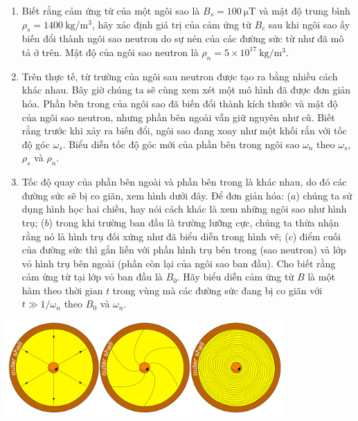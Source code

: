 \begin{vd}[Magnetars]
\begin{enumerate}[1)]
\begin{center}

    \end{center}
    \item Biết rằng cảm ứng từ của một ngôi sao là $B_{s}=100~\mathrm{\mu T}$ và mật độ trung bình $\rho_{s}=1400~\mathrm{kg/m^3}$, hãy xác định giá trị của cảm ứng từ $B_{c}$ sau khi ngôi sao ấy biến đổi thành ngôi sao neutron do sự nén của các đường sức từ như đã mô tả ở trên. Mật độ của ngôi sao neutron là $\rho_{n}=5\times10^{17}~\mathrm{kg/m^3}$.
    \item Trên thực tế, từ trường của ngôi sau neutron được tạo ra bằng nhiều cách khác nhau. Bây giờ chúng ta sẽ cùng xem xét một mô hình đã được đơn giản hóa. Phần bên trong của ngôi sao đã biến đổi thành kích thước và mật độ của ngôi sao neutron, nhưng phần bên ngoài vẫn giữ nguyên như cũ. Biết rằng trước khi xảy ra biến đổi, ngôi sao đang xoay như một khối rắn với tốc độ góc $\omega_{s}$. Biểu diễn tốc độ góc mới của phần bên trong ngôi sao $\omega_{n}$ theo $\omega_{s}$, $\rho_{s}$ và $\rho_{n}$.
    \item Tốc độ quay của phần bên ngoài và phần bên trong là khác nhau, do đó các đường sức sẽ bị co giãn, xem hình dưới đây. Để đơn giản hóa: ($a$) chúng ta sử dụng hình học hai chiều, hay nói cách khác là xem những ngôi sao như hình trụ; ($b$) trong khi trường ban đầu là trường lưỡng cực, chúng ta thừa nhận rằng nó là hình trụ đối xứng như đã biểu diễn trong hình vẽ; ($c$) điểm cuối của đường sức thì gắn liền với phần hình trụ bên trong (sao neutron) và lớp vỏ hình trụ bên ngoài (phần còn lại của ngôi sao ban đầu). Cho biết rằng cảm ứng từ tại lớp vỏ ban đầu là $B_0$. Hãy biểu diễn cảm ứng từ $B$ là một hàm theo thời gian $t$ trong vùng mà các đường sức đang bị co giãn với $t \gg 1/ \omega_{n}$ theo $B_0$ và $\omega_{n}$.
    \end{enumerate}
    \begin{center}
        \includegraphics[width= 0.8\textwidth]{Anh/2016.png}

\end{center}
\end{vd}
